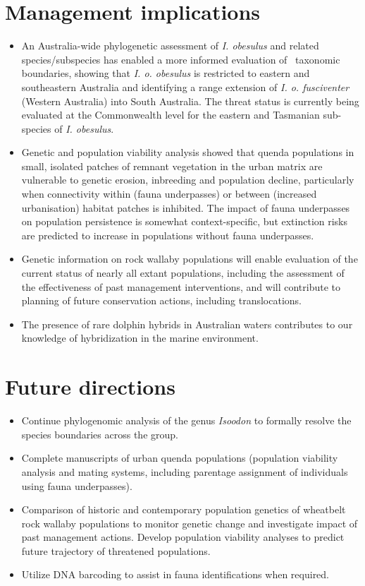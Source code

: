 \documentclass[version=last,
    paper=a4, %
    10pt, %
    usenames,
    dvipsnames,
    oneside, %
    headings=openany, %
    DIV=15 %
]{scrbook}
\begin{document}
\section*{Management implications}
\begin{itemize}
\itemsep1pt\parskip0pt
\item
  An Australia-wide phylogenetic assessment of \emph{I. obesulus} and
  related species/subspecies has enabled a more informed evaluation of~
  taxonomic boundaries, showing that \emph{I. o. obesulus} is restricted
  to eastern and southeastern Australia and identifying a range
  extension of \emph{I. o. fusciventer} (Western Australia) into South
  Australia. The threat status is currently being evaluated at the
  Commonwealth level for the eastern and Tasmanian sub-species of
  \emph{I. obesulus}.
\item
  Genetic and population viability analysis showed that quenda
  populations in small, isolated patches of remnant vegetation in the
  urban matrix are vulnerable to genetic erosion, inbreeding and
  population decline, particularly when connectivity within (fauna
  underpasses) or between (increased urbanisation) habitat patches is
  inhibited. The impact of fauna underpasses on population persistence
  is somewhat context-specific, but extinction risks are predicted to
  increase in populations without fauna underpasses.
\item
  Genetic information on rock wallaby populations will enable evaluation
  of the current status of nearly all extant populations, including the
  assessment of the effectiveness of past management interventions, and
  will contribute to planning of future conservation actions, including
  translocations. ~
\item
  The presence of rare dolphin hybrids in Australian waters contributes
  to our knowledge of hybridization in the marine environment.
\end{itemize}



\section*{Future directions}
\begin{itemize}
\itemsep1pt\parskip0pt
\item
  Continue phylogenomic analysis of the genus \emph{Isoodon} to formally
  resolve the species boundaries across the group.
\item
  Complete manuscripts of urban quenda populations (population viability
  analysis and mating systems, including parentage assignment of
  individuals using fauna underpasses).
\item
  Comparison of historic and contemporary population genetics of
  wheatbelt rock wallaby populations to monitor genetic change and
  investigate impact of past management actions. Develop population
  viability analyses to predict future trajectory of threatened
  populations.
\item
  Utilize DNA barcoding to assist in fauna identifications when
  required.
\end{itemize}



\end{document}
